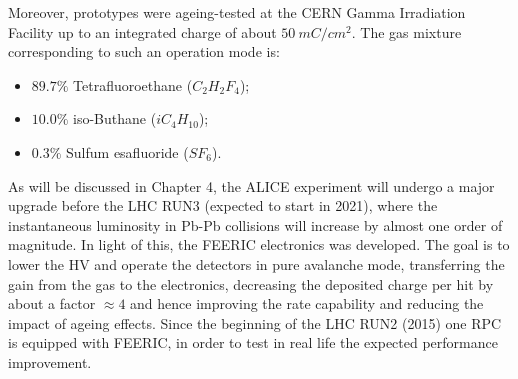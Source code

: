 Moreover, prototypes were ageing-tested at the CERN Gamma Irradiation Facility up to an integrated charge of about $50\ mC/cm^2$.
The gas mixture corresponding to such an operation mode is:
\begin{itemize}
    \item $89.7\%$ Tetrafluoroethane ($C_2H_2F_4$);
    \item $10.0\%$ iso-Buthane ($iC_4H_{10}$);
    \item $0.3\%$ Sulfum esafluoride ($SF_6$).
\end{itemize}
As will be discussed in Chapter 4, the ALICE experiment will undergo a major upgrade before the LHC RUN3 (expected to start in 2021), where the instantaneous luminosity in Pb-Pb collisions will increase by almost one order of magnitude. 
In light of this, the FEERIC electronics was developed. 
The goal is to lower the HV and operate the detectors in pure avalanche mode, transferring the gain from the gas to the electronics, decreasing the deposited charge per hit by about a factor $\approx4$ and hence improving the rate capability and reducing the impact of ageing effects. 
Since the beginning of the LHC RUN2 (2015) one RPC is equipped with FEERIC, in order to test in real life the expected performance improvement.
